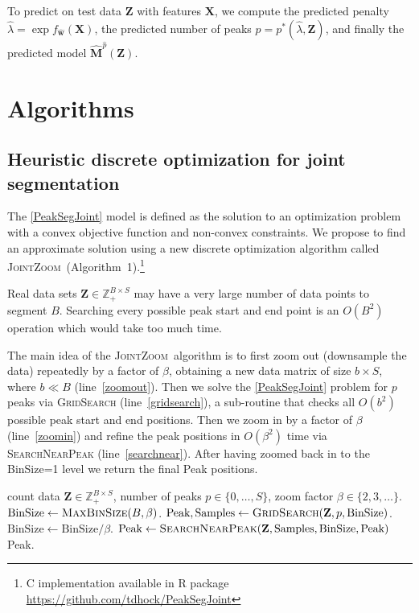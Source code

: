 \documentclass{article} %
\newcommand{\ZZ}{\mathbb Z}
\newcommand{\JointHeuristic}{\textsc{JointZoom}}
\begin{document}
To predict on test data $\mathbf Z$ with features $\mathbf
X$, we compute the predicted penalty $\hat \lambda = \exp
f_{\mathbf{\hat w}}(\mathbf X)$, the predicted number of
peaks $\hat p = p^*(\hat \lambda, \mathbf Z)$, and finally the
predicted model $\mathbf{\hat M}^{\hat p}(\mathbf Z)$.

\section{Algorithms}
\label{sec:algorithms}

\subsection{Heuristic discrete optimization for joint segmentation}

The \ref{PeakSegJoint} model is defined as the solution to an
optimization problem with a convex objective function and non-convex
constraints. We propose to find an approximate solution using a new
discrete optimization algorithm called
\JointHeuristic~(Algorithm~1).\footnote{C implementation available in
  R package \url{https://github.com/tdhock/PeakSegJoint}}

Real data sets $\mathbf Z\in\ZZ_+^{B\times S}$ may have a very large
number of data points to segment $B$. Searching every possible peak
start and end point is an $O(B^2)$ operation which would take too much
time. 

The main idea of the \JointHeuristic\ algorithm is to first zoom out
(downsample the data) repeatedly by a factor of $\beta$, obtaining a
new data matrix of size $b\times S$, where $b \ll B$
(line~\ref{zoomout}). Then we solve the \ref{PeakSegJoint} problem for
$p$ peaks via \textsc{GridSearch} (line~\ref{gridsearch}), a
sub-routine that checks all $O(b^2)$ possible peak start and end
positions. Then we zoom in by a factor of $\beta$ (line~\ref{zoomin})
and refine the peak positions in $O(\beta^2)$ time via
\textsc{SearchNearPeak} (line~\ref{searchnear}). After having zoomed
back in to the BinSize=1 level we return the final Peak
positions. 

\begin{algorithm}[H]
\begin{algorithmic}[1]
  \REQUIRE count data $\mathbf Z\in\ZZ_+^{B\times S}$, number of
  peaks $p\in\{0, \dots, S\}$, zoom factor
  $\beta\in\{2, 3, \dots\}$.
  \STATE $\textrm{BinSize} \gets \textsc{MaxBinSize}(B, \beta)$. \label{zoomout}
  \STATE $\textrm{Peak}, \textrm{Samples} \gets \label{gridsearch}
  \textsc{GridSearch}(\mathbf Z, p, \textrm{BinSize})$.
  \STATE $\textrm{BinSize} \gets \textrm{BinSize} / \beta$. \label{zoomin}
  \STATE $\textrm{Peak} \gets
  \textsc{SearchNearPeak}(\mathbf Z, \textrm{Samples}, \label{searchnear}
  \textrm{BinSize}, \textrm{Peak})$
  \ENDWHILE
  \RETURN Peak.
\caption{\JointHeuristic}
\end{algorithmic}\label{algo}
\end{algorithm}
\end{document}
